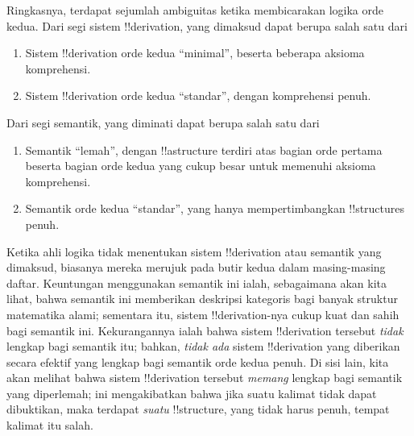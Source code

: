 \documentclass[../../../include/open-logic-section]{subfiles}
\begin{document}
Ringkasnya, terdapat sejumlah ambiguitas ketika membicarakan logika orde
kedua. Dari segi sistem !!{derivation}, yang dimaksud dapat berupa salah satu
dari
\begin{enumerate}
\item Sistem !!{derivation} orde kedua ``minimal'', beserta beberapa aksioma
  komprehensi.
\item Sistem !!{derivation} orde kedua ``standar'', dengan komprehensi penuh.
\end{enumerate}
Dari segi semantik, yang diminati dapat berupa salah satu dari
\begin{enumerate}
\item Semantik ``lemah'', dengan !!a{structure} terdiri atas bagian orde
  pertama beserta bagian orde kedua yang cukup besar untuk memenuhi aksioma
  komprehensi.
\item Semantik orde kedua ``standar'', yang hanya mempertimbangkan
  !!{structure}s penuh.
\end{enumerate}
Ketika ahli logika tidak menentukan sistem !!{derivation} atau semantik yang
dimaksud, biasanya mereka merujuk pada butir kedua dalam masing-masing daftar.
Keuntungan menggunakan semantik ini ialah, sebagaimana akan kita lihat, bahwa
semantik ini memberikan deskripsi kategoris bagi banyak struktur matematika
alami; sementara itu, sistem !!{derivation}-nya cukup kuat dan sahih bagi
semantik ini. Kekurangannya ialah bahwa sistem !!{derivation} tersebut
\emph{tidak} lengkap bagi semantik itu; bahkan, \emph{tidak ada} sistem
!!{derivation} yang diberikan secara efektif yang lengkap bagi semantik orde
kedua penuh. Di sisi lain, kita akan melihat bahwa sistem !!{derivation}
tersebut \emph{memang} lengkap bagi semantik yang diperlemah; ini mengakibatkan bahwa
jika suatu kalimat tidak dapat dibuktikan, maka terdapat \emph{suatu}
!!{structure}, yang tidak harus penuh, tempat kalimat itu salah.
\end{document}
